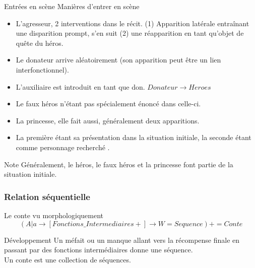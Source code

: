 \documentclass{beamer}
\begin{document}
\begin{frame}{Entrées en scène}
  Manières d'entrer en scène
  \scriptsize
  \begin{itemize}
    \item L'agresseur, 2 interventions dans le récit. (1) Apparition latérale entraînant une disparition prompt, s'en suit (2) une réapparition en tant qu'objet de quête du héros.
    \item Le donateur arrive aléatoirement (son apparition peut être un lien interfonctionnel).
    \item L'auxiliaire est introduit en tant que don. $Donateur \rightarrow Heroes$
    \item Le faux héros n'étant pas spécialement énoncé dans celle-ci.
    \item La princesse, elle fait aussi, généralement deux apparitions.
    \item La première étant sa présentation dans la situation initiale, la seconde étant comme  personnage recherché .
  \end{itemize}
  \normalsize
  \begin{block}{Note}
    Généralement, le héros, le faux héros et la princesse font partie de la situation initiale.
  \end{block}
\end{frame}

\subsubsection{Relation séquentielle}
\begin{frame}{Le conte vu morphologiquement}
  $$(A|a \rightarrow [Fonctions\_Intermediaires+] \rightarrow W  = Sequence)+ = Conte$$
  \begin{block}{Développement}
    Un méfait ou un manque allant vers la récompense finale en passant par des fonctions intermédiaires donne une séquence.\\ Un conte est une collection de séquences.
  \end{block}
\end{frame}
\end{document}
